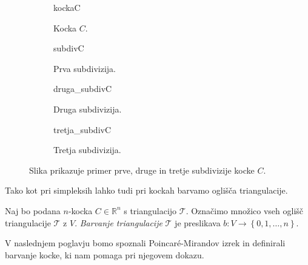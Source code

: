 \documentclass[mat1]{fmfdelo}
\newcommand{\R}{\mathbb R}
\newcommand{\0}{\underline{0}}
\newcommand{\pT}{\mathcal T}
\begin{document}
\begin{figure}[h]  
\centering 
	\begin{subfigure}{0.4\linewidth} 
		\centering 
		{kockaC}
		\caption{Kocka $C$.}
	\end{subfigure}
	\vspace{0.5cm}
	\begin{subfigure}{0.4\linewidth} 
	\centering 
		{subdivC}
		\caption{Prva subdivizija.}
	\end{subfigure}
	\begin{subfigure}[b]{0.4\linewidth}
	\centering 
		{druga_subdivC}
		\caption{Druga subdivizija.}
	\end{subfigure}
	\begin{subfigure}[b]{0.4\linewidth}
	\centering 
		{tretja_subdivC}
		\caption{Tretja subdivizija.}
	\end{subfigure}
\caption{Slika prikazuje primer prve, druge in tretje subdivizije kocke $C$.}
\end{figure} 
Tako kot pri simpleksih lahko tudi pri kockah barvamo oglišča triangulacije.
\begin{definicija}
Naj bo podana $n$-kocka $C \in \R^n$ s triangulacijo $\pT$. Označimo množico vseh oglišč triangulacije $\pT$ z $V$. \emph{Barvanje triangulacije} $\pT$ je preslikava $b : V \to \left \{0, 1, \dots, n \right \}$.
\end{definicija}
V naslednjem poglavju bomo spoznali Poincar\'e-Mirandov izrek in definirali barvanje kocke, ki nam pomaga pri njegovem dokazu.
%
\end{document}

